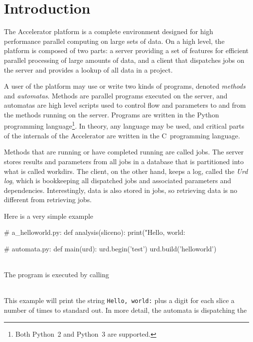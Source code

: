 
\section{Introduction}

The Accelerator platform is a complete environment designed for high
performance parallel computing on large sets of data.  On a high
level, the platform is composed of two parts: a server providing a set
of features for efficient parallel processing of large amounts of
data, and a client that dispatches jobs on the server and provides a
lookup of all data in a project.

A user of the platform may use or write two kinds of programs, denoted
\textsl{methods} and \textsl{automatas}.  Methods are parallel
programs executed on the server, and automatas are high level scripts
used to control flow and parameters to and from the methods running on
the server.  Programs are written in the Python programming
language\footnote{ Both Python~2 and Python~3 are supported.}.  In
theory, any language may be used, and critical parts of the internals
of the Accelerator are written in the C~programming language.

Methods that are running or have completed running are called jobs.
The server stores results and parameters from all jobs in a database
that is partitioned into what is called workdirs.  The client, on the
other hand, keeps a log, called the \textsl{Urd log}, which is
bookkeeping all dispatched jobs and associated parameters and
dependencies.  Interestingly, data is also stored in jobs, so
retrieving data is no different from retrieving jobs.

Here is a very simple example
\\
\begin{python}
# a_helloworld.py:
def analysis(sliceno):
  print("Hello, world: %

# automata.py:
def main(urd):
  urd.begin('test')
  urd.build('helloworld')
\end{python}
\\
The program is executed by calling
\\
\begin{shell}
\end{shell}
\\
This example will print the string \texttt{Hello, world:} plus a digit
for each slice a number of
times to standard
out.  In more detail, the automata is dispatching the



